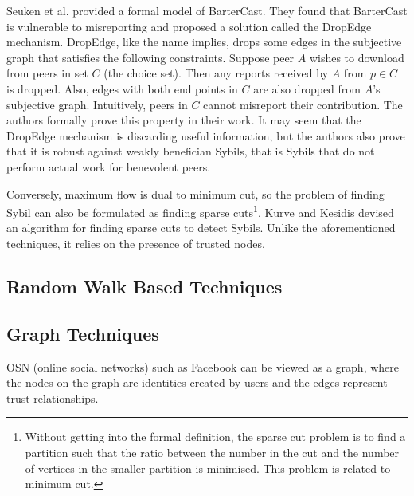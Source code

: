 Seuken et al. provided a formal model of BarterCast. They found that BarterCast
is vulnerable to misreporting and proposed a solution called the DropEdge
mechanism\cite{seuken2011sybil, seuken2014sybil}. DropEdge, like the name
implies, drops some edges in the subjective graph that satisfies the following
constraints. Suppose peer $A$ wishes to download from peers in set $C$ (the
choice set). Then any reports received by $A$ from $p \in C$ is dropped. Also,
edges with both end points in $C$ are also dropped from $A$'s subjective graph.
Intuitively, peers in $C$ cannot misreport their contribution. The authors
formally prove this property in their work. It may seem that the DropEdge
mechanism is discarding useful information, but the authors also prove that it
is robust against weakly benefician Sybils, that is Sybils that do not perform
actual work for benevolent peers.

Conversely, maximum flow is dual to minimum cut, so the problem of finding Sybil
can also be formulated as finding sparse cuts\footnote{Without getting into the
  formal definition, the sparse cut problem is to find a partition such that the
  ratio between the number in the cut and the number of vertices in the smaller
  partition is minimised. This problem is related to minimum cut.}. Kurve and
Kesidis devised an algorithm for finding sparse cuts to detect
Sybils\cite{kurve2011sybil}. Unlike the aforementioned techniques, it relies on
the presence of trusted nodes.


\subsection{Random Walk Based Techniques}



\subsection{Graph Techniques}\label{sec:graph}

OSN (online social networks) such as Facebook can be viewed as a graph, where
the nodes on the graph are identities created by users and the edges represent
trust relationships.

